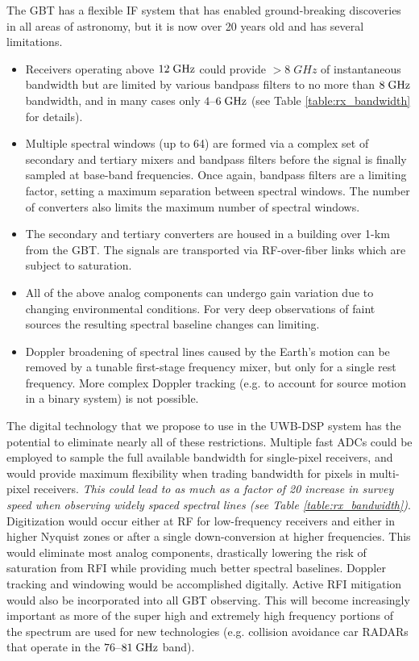 \documentclass[10pt]{myNSF}
\begin{document}
The GBT has a flexible IF system that has enabled ground-breaking
discoveries in all areas of astronomy, but it is now over 20 years old
and has several limitations.
\begin{itemize}
  \item{Receivers operating above $12\; \textrm{GHz}$ could provide $>8\; GHz$
    of instantaneous bandwidth but are limited by various bandpass
    filters to no more than $8\; \textrm{GHz}$ bandwidth, and in many cases
    only $4$--$6\; \textrm{GHz}$ (see Table \ref{table:rx_bandwidth} for
    details).}
  \item{Multiple spectral windows (up to 64) are formed via a complex
    set of secondary and tertiary mixers and bandpass filters before
    the signal is finally sampled at base-band frequencies.  Once
    again, bandpass filters are a limiting factor, setting a maximum
    separation between spectral windows.  The number of converters
    also limits the maximum number of spectral windows.}
  \item{The secondary and tertiary converters are housed in a building
    over 1-km from the GBT.  The signals are transported via
    RF-over-fiber links which are subject to saturation.}
  \item{All of the above analog components can undergo gain variation
    due to changing environmental conditions.  For very deep
    observations of faint sources the resulting spectral baseline
    changes can limiting.}
  \item{Doppler broadening of spectral lines caused by the Earth's
    motion can be removed by a tunable first-stage frequency mixer,
    but only for a single rest frequency.  More complex Doppler
    tracking (e.g. to account for source motion in a binary system) is
    not possible.}
\end{itemize}

The digital technology that we propose to use in the UWB-DSP system
has the potential to eliminate nearly all of these restrictions.
Multiple fast ADCs could be employed to sample the full available
bandwidth for single-pixel receivers, and would provide maximum
flexibility when trading bandwidth for pixels in multi-pixel
receivers.  \emph{This could lead to as much as a factor of 20
  increase in survey speed when observing widely spaced spectral lines
  (see Table \ref{table:rx_bandwidth})}.  Digitization would occur
either at RF for low-frequency receivers and either in higher Nyquist
zones or after a single down-conversion at higher frequencies.  This
would eliminate most analog components, drastically lowering the risk
of saturation from RFI while providing much better spectral baselines.
Doppler tracking and windowing would be accomplished digitally.
Active RFI mitigation would also be incorporated into all GBT
observing.  This will become increasingly important as more of the
super high and extremely high frequency portions of the spectrum are
used for new technologies (e.g. collision avoidance car RADARs that
operate in the $76$--$81\; \textrm{GHz}$ band).
\end{document}
